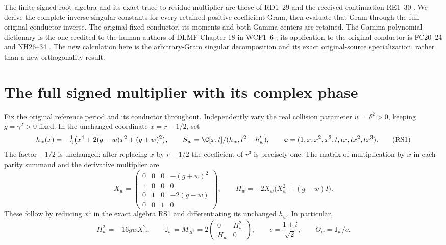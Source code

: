 

The finite signed-root algebra and its exact trace-to-residue
multiplier are those of RD1--29 and the received continuation
RE1--30 \cite{Fable037,ReceivedRE}. We derive the complete inverse singular
constants for every retained positive coefficient Gram, then
evaluate that Gram through the full original conductor inverse.
The original fixed conductor, its moments and both Gamma centers
are retained. The Gamma polynomial dictionary is the one credited
to the human authors of DLMF Chapter 18 in WCF1--6
\cite{WCF,DLMF18Source}; its application to the original conductor is
FC20--24 and NH26--34 \cite{Fable037}. The new calculation here is the
arbitrary-Gram singular decomposition and its exact original-source
specialization, rather than a new orthogonality result.

\section{The full signed multiplier with its complex phase}
Fix the original reference period and its conductor throughout.
Independently vary the real collision parameter $w=\delta^2>0$,
keeping $g=\gamma^2>0$ fixed. In the unchanged coordinate
$x=r-1/2$, set
\begin{equation}
 h_w(x)=-\tfrac12\bigl(x^4+2(g-w)x^2+(g+w)^2\bigr),\qquad
 S_w=\C[x,t]/(h_w,t^2-h_w'),\qquad
 \mathbf e=(1,x,x^2,x^3,t,tx,tx^2,tx^3).
 \tag{RS1}
\end{equation}
The factor $-1/2$ is unchanged: after replacing $x$ by $r-1/2$
the coefficient of $r^3$ is precisely one. The matrix of
multiplication by $x$ in each parity summand and the derivative
multiplier are
\begin{equation}
 X_w=\begin{pmatrix}
 0&0&0&-(g+w)^2\\1&0&0&0\\0&1&0&-2(g-w)\\0&0&1&0
 \end{pmatrix},\qquad
 H_w=-2X_w\bigl(X_w^2+(g-w)I\bigr).
 \tag{RS2}
\end{equation}
These follow by reducing $x^4$ in the exact algebra RS1 and
differentiating its unchanged $h_w$. In particular,
\begin{equation}
 H_w^2=-16gwX_w^2,\qquad
 \mathsf J_w=M_{2t^3}=2\begin{pmatrix}0&H_w^2\\H_w&0\end{pmatrix},
 \qquad c=\frac{1+i}{\sqrt2},\qquad \Theta_w=\mathsf J_w/c.
 \tag{RS3}
\end{equation}
